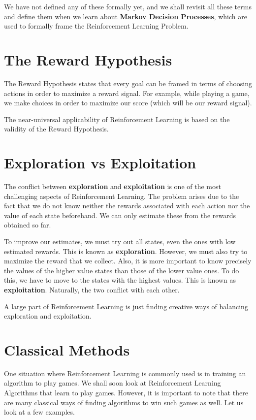 \documentclass[12pt]{report}
\begin{document}
We have not defined any of these formally yet, and we shall revisit all these terms and define them when we learn about \textbf{Markov Decision Processes}, which are used to formally frame the Reinforcement Learning Problem.

\section{The Reward Hypothesis}
The Reward Hypothesis states that every goal can be framed in terms of choosing actions in order to maximize a reward signal. For example, while playing a game, we make choices in order to maximize our score (which will be our reward signal).

The near-universal applicability of Reinforcement Learning is based on the validity of the Reward Hypothesis.

\section{Exploration vs Exploitation}
The conflict between \textbf{exploration} and \textbf{exploitation} is one of the most challenging aspects of Reinforcement Learning.
The problem arises due to the fact that we do not know neither the rewards associated with each action nor the value of each state beforehand.
We can only estimate these from the rewards obtained so far.

To improve our estimates, we must try out all states, even the ones with low estimated rewards. This is known as \textbf{exploration}.
However, we must also try to maximize the reward that we collect. Also, it is more important to know precisely the values of the higher value states than those of the lower value ones. 
To do this, we have to move to the states with the highest values. This is known as \textbf{exploitation}.
Naturally, the two conflict with each other. 

A large part of Reinforcement Learning is just finding creative ways of balancing exploration and exploitation.

\section{Classical Methods}
One situation where Reinforcement Learning is commonly used is in training an algorithm to play games. We shall soon look at Reinforcement Learning Algorithms that learn
to play games. However, it is important to note that there are many classical ways of finding algorithms to win such games as well. Let us look at a few examples.
\end{document}
